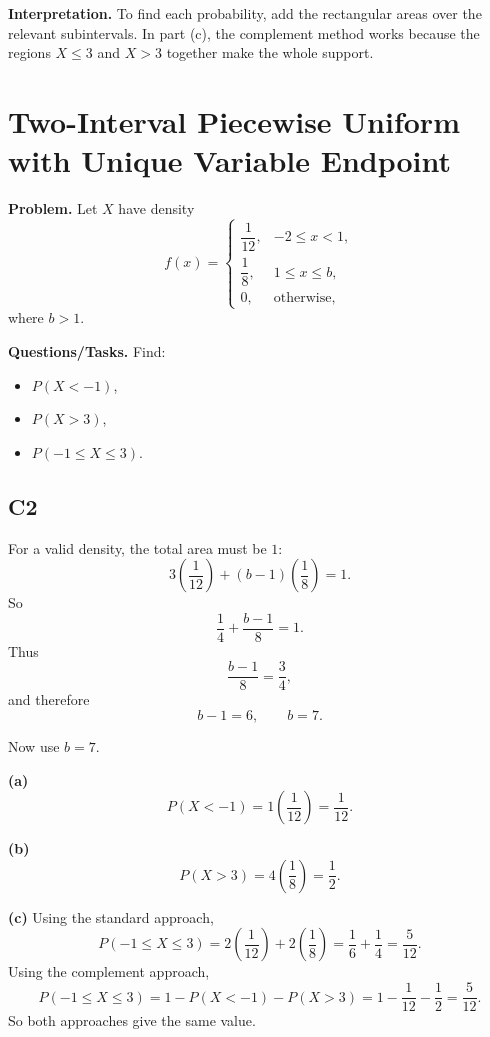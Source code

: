 \textbf{Interpretation.}
To find each probability, add the rectangular areas over the relevant subintervals. In part (c), the complement method works because the regions $X\le 3$ and $X>3$ together make the whole support.

\section{Two-Interval Piecewise Uniform with Unique Variable Endpoint}

\textbf{Problem.}
Let $X$ have density
\[
f(x)=
\begin{cases}
	\dfrac{1}{12}, & -2\le x<1,\\[4pt]
	\dfrac{1}{8}, & 1\le x\le b,\\[4pt]
	0, & \text{otherwise,}
\end{cases}
\]
where $b>1$.

\textbf{Questions/Tasks.}
Find:
\begin{itemize}
	\item[(a)] $P(X<-1)$,
	\item[(b)] $P(X>3)$,
	\item[(c)] $P(-1\le X\le 3)$.
\end{itemize}

\subsection*{C2}
For a valid density, the total area must be $1$:
\[
3\left(\frac{1}{12}\right)+(b-1)\left(\frac{1}{8}\right)=1.
\]
So
\[
\frac{1}{4}+\frac{b-1}{8}=1.
\]
Thus
\[
\frac{b-1}{8}=\frac{3}{4},
\]
and therefore
\[
b-1=6,
\qquad
b=7.
\]

Now use $b=7$.


\textbf{(a)}
\[
P(X<-1)=1\left(\frac{1}{12}\right)=\frac{1}{12}.
\]


\textbf{(b)}
\[
P(X>3)=4\left(\frac{1}{8}\right)=\frac{1}{2}.
\]


\textbf{(c)} Using the standard approach,
\[
P(-1\le X\le 3)=2\left(\frac{1}{12}\right)+2\left(\frac{1}{8}\right)
=\frac{1}{6}+\frac{1}{4}
=\frac{5}{12}.
\]
Using the complement approach,
\[
P(-1\le X\le 3)=1-P(X<-1)-P(X>3)
=1-\frac{1}{12}-\frac{1}{2}
=\frac{5}{12}.
\]
So both approaches give the same value.

